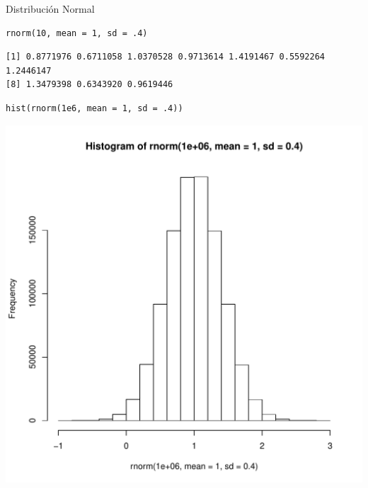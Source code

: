 \documentclass[xcolor={usenames,svgnames,dvipsnames}]{beamer}
\begin{document}
\begin{frame}[fragile,label=sec-3-3]{Distribución Normal}
 \lstset{language=R,label= ,caption= ,numbers=none}
\begin{lstlisting}
rnorm(10, mean = 1, sd = .4)
\end{lstlisting}

\begin{verbatim}
[1] 0.8771976 0.6711058 1.0370528 0.9713614 1.4191467 0.5592264 1.2446147
[8] 1.3479398 0.6343920 0.9619446
\end{verbatim}

\lstset{language=R,label= ,caption= ,numbers=none}
\begin{lstlisting}
hist(rnorm(1e6, mean = 1, sd = .4))
\end{lstlisting}

\includegraphics[height=0.6\textheight]{figs/rnorm.pdf}
\end{frame}
\end{document}
